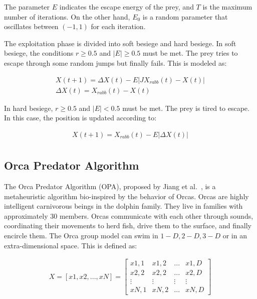 \documentclass{elsarticle}
\begin{document}
\noindent The parameter $E$ indicates the escape energy of the prey, and $T$ is the maximum number of iterations. On the other hand, $E_0$ is a random parameter that oscillates between $(-1,1)$ for each iteration.

\noindent The exploitation phase is divided into soft besiege and hard besiege. In soft besiege, the conditions $r \geq 0.5$ and $|E| \geq 0.5$ must be met. The prey tries to escape through some random jumps but finally fails. This is modeled as:

\begin{equation}
\begin{gathered}
X(t+1) = \Delta X(t) - E |J X_{rabb}(t) -X(t)| \\
\Delta X(t) = X_{rabb}(t) - X(t)
\end{gathered}
\label{eq16}
\end{equation}

\noindent In hard besiege, $r \geq 0.5$ and $|E| < 0.5$ must be met. The prey is tired to escape. In this case, the position is updated according to:

\begin{equation}
\begin{gathered}
X(t+1) = X_{rabb}(t) - E |\Delta X(t)| \\
\end{gathered}
\label{eq17}
\end{equation}

\subsection{Orca Predator Algorithm}

\noindent The Orca Predator Algorithm (OPA), proposed by Jiang et al.~\cite{Jiang2022}, is a metaheuristic algorithm bio-inspired by the behavior of Orcas. Orcas are highly intelligent carnivorous beings in the dolphin family. They live in families with approximately 30 members. Orcas communicate with each other through sounds, coordinating their movements to herd fish, drive them to the surface, and finally encircle them. The Orca group model can swim in $1-D, 2-D, 3-D$ or in an extra-dimensional space. This is defined as:

\begin{equation}
\begin{gathered}
X = [ x1, x2, ..., xN ] =\begin{bmatrix}
  x1,1 & x1,2 & ... & x1,D  \\
  x2,2 & x2,2 & ... & x2,D  \\
  \vdots & \vdots & \vdots & \vdots \\
  xN,1 & xN,2 & ... & xN,D
\end{bmatrix}
\end{gathered}
\label{eq18}
\end{equation}
\end{document}
